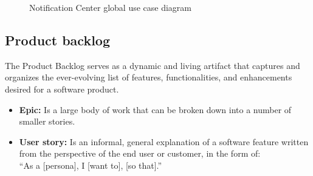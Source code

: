 \begin{figure}[hbt!]
      \centering
      
      \caption{Notification Center global use case diagram}
      \label{g-usecase}
\end{figure}

\subsection{Product backlog}
The Product Backlog serves as a dynamic and living artifact that captures and organizes the
ever-evolving list of features, functionalities, and enhancements desired for a software product.

\begin{itemize}
      \item \textbf{Epic:} Is a large body of work that can be broken down into a number of smaller stories.
      \item \textbf{User story:} Is an informal, general explanation of a software feature written from the
            perspective of the end user or customer, in the form of: \\ “As a [persona], I [want to], [so that].” \\
\end{itemize}

